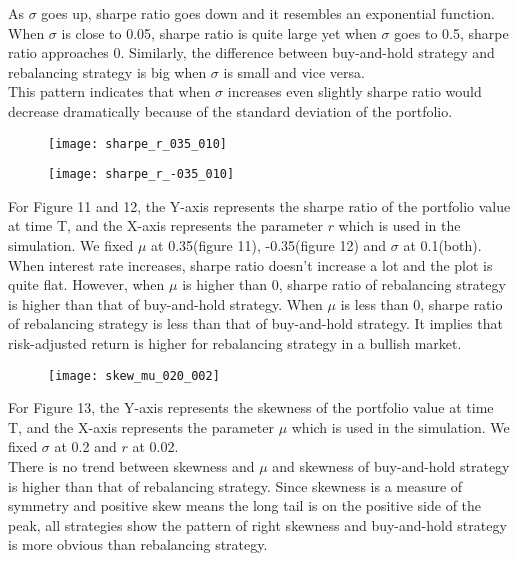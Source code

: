 \documentclass[
10pt, %
a4paper, %
oneside, %
headinclude,footinclude, %
BCOR5mm, %
]{scrartcl}
\begin{document}
As $\sigma$ goes up, sharpe ratio goes down and it resembles an exponential function. When $\sigma$ is close to 0.05, sharpe ratio is quite large yet when $\sigma$ goes to 0.5, sharpe ratio approaches 0. Similarly, the difference between buy-and-hold strategy and rebalancing strategy is big when $\sigma$ is small and vice versa.\\

This pattern indicates that when $\sigma$ increases even slightly sharpe ratio would decrease dramatically because of the standard deviation of the portfolio.\\

\begin{figure}[H]
	\centering
	\texttt{[image: sharpe\_r\_035\_010]}
	\caption{}
	\label{fig:sharper035010}
\end{figure}

\begin{figure}[H]
	\centering
	\texttt{[image: sharpe\_r\_-035\_010]}
	\caption{}
	\label{fig:sharper-035010}
\end{figure}
For Figure 11 and 12, the Y-axis represents the sharpe ratio of the portfolio value at time T, and the X-axis represents the parameter $r$ which is used in the simulation. We fixed $\mu$ at 0.35(figure 11), -0.35(figure 12) and $\sigma$ at 0.1(both).\\

When interest rate increases, sharpe ratio doesn’t increase a lot and the plot is quite flat. However,  when $\mu$ is higher than 0, sharpe ratio of rebalancing strategy is higher than that of buy-and-hold strategy. When $\mu$ is less than 0, sharpe ratio of rebalancing strategy is less than that of buy-and-hold strategy. It implies that risk-adjusted return is higher for rebalancing strategy in a bullish market.\\

\begin{figure}[H]
	\centering
	\texttt{[image: skew\_mu\_020\_002]}
	\caption{}
	\label{fig:skewmu020002}
\end{figure}
For Figure 13, the Y-axis represents the skewness of the portfolio value at time T, and the X-axis represents the parameter $\mu$ which is used in the simulation. We fixed $\sigma$ at 0.2 and $r$ at 0.02.\\

There is no trend between skewness and $\mu$ and skewness of buy-and-hold strategy is higher than that of rebalancing strategy. Since skewness is a measure of symmetry and positive skew means the long tail is on the positive side of the peak, all strategies show the pattern of right skewness and buy-and-hold strategy is more obvious than rebalancing strategy.\\
\end{document}
